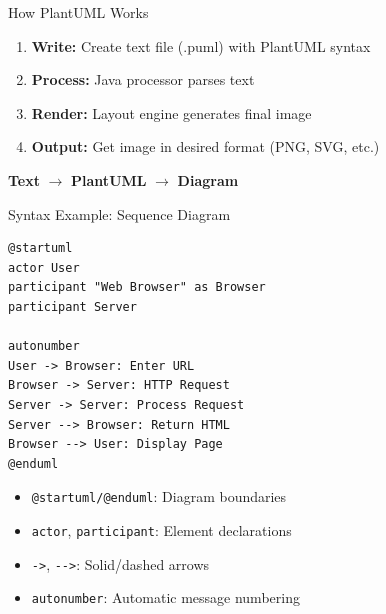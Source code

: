 \documentclass{beamer}
\begin{document}
\begin{frame}[t]{How PlantUML Works}
    \begin{enumerate}
        \item \textbf{Write:} Create text file (.puml) with PlantUML syntax
        \item \textbf{Process:} Java processor parses text
        \item \textbf{Render:} Layout engine generates final image
        \item \textbf{Output:} Get image in desired format (PNG, SVG, etc.)
    \end{enumerate}
    
    \begin{center}
    \textbf{Text} $\rightarrow$ \textbf{PlantUML} $\rightarrow$ \textbf{Diagram}
    \end{center}
\end{frame}

\begin{frame}[fragile,t]{Syntax Example: Sequence Diagram}
    \begin{lstlisting}[style=plantuml]
@startuml
actor User
participant "Web Browser" as Browser
participant Server

autonumber
User -> Browser: Enter URL
Browser -> Server: HTTP Request
Server -> Server: Process Request
Server --> Browser: Return HTML
Browser --> User: Display Page
@enduml
    \end{lstlisting}

    
    
    \small
    \begin{itemize}
        \item \texttt{@startuml/@enduml}: Diagram boundaries
        \item \texttt{actor}, \texttt{participant}: Element declarations
        \item \texttt{->}, \texttt{-{}->}: Solid/dashed arrows
        \item \texttt{autonumber}: Automatic message numbering
    \end{itemize}
\end{frame}
\end{document}
